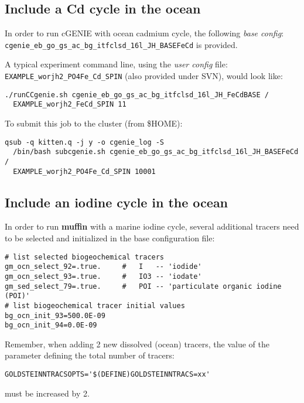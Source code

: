 \subsection*{Include a Cd cycle in the ocean}
\vspace{1mm}

In order to run cGENIE with ocean cadmium cycle, the following \textit{base config}: \\
\texttt{cgenie\_eb\_go\_gs\_ac\_bg\_itfclsd\_16l\_JH\_BASEFeCd} is provided.

A typical experiment command line, using the \textit{user config} file: \texttt{EXAMPLE\_worjh2\_PO4Fe\_Cd\_SPIN} (also provided under SVN), would look like:
\vspace{-4pt}\begin{verbatim}
./runCCgenie.sh cgenie_eb_go_gs_ac_bg_itfclsd_16l_JH_FeCdBASE /
  EXAMPLE_worjh2_FeCd_SPIN 11
\end{verbatim}\vspace{-4pt}

To submit this job to the cluster (from \$HOME):
\vspace{-4pt}\begin{verbatim}
qsub -q kitten.q -j y -o cgenie_log -S
  /bin/bash subcgenie.sh cgenie_eb_go_gs_ac_bg_itfclsd_16l_JH_BASEFeCd /
  EXAMPLE_worjh2_PO4Fe_Cd_SPIN 10001
\end{verbatim}\vspace{-4pt}

%
\newpage
\subsection*{Include an iodine cycle in the ocean}
\vspace{1mm}

In order to run \textbf{muffin} with a marine iodine cycle, several additional tracers need to be selected and initialized in the base configuration file:
\vspace{-1mm}\small\begin{verbatim}
# list selected biogeochemical tracers
gm_ocn_select_92=.true.     #   I   -- 'iodide' 
gm_ocn_select_93=.true.     #   IO3 -- 'iodate' 
gm_sed_select_79=.true.     #   POI -- 'particulate organic iodine (POI)'
# list biogeochemical tracer initial values
bg_ocn_init_93=500.0E-09
bg_ocn_init_94=0.0E-09
\end{verbatim}\normalsize\vspace{-1mm}
Remember, when adding 2 new dissolved (ocean) tracers, the value of the parameter defining the total number of tracers:
\vspace{-2mm}\small\begin{verbatim}
GOLDSTEINNTRACSOPTS='$(DEFINE)GOLDSTEINNTRACS=xx'
\end{verbatim}\normalsize\vspace{-2mm}
must be increased by 2.

